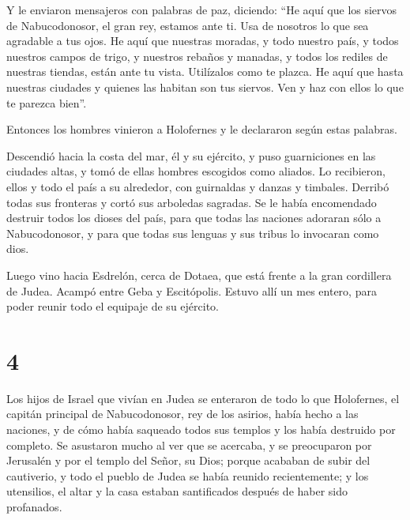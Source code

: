  Y le enviaron mensajeros con palabras de paz, diciendo:
 ``He aquí que los siervos de Nabucodonosor, el gran rey,
estamos ante ti. Usa de nosotros lo que sea agradable a tus ojos.
 He aquí que nuestras moradas, y todo nuestro país, y
todos nuestros campos de trigo, y nuestros rebaños y manadas, y todos
los rediles de nuestras tiendas, están ante tu vista. Utilízalos como te
plazca.  He aquí que hasta nuestras ciudades y quienes las
habitan son tus siervos. Ven y haz con ellos lo que te parezca bien''.

 Entonces los hombres vinieron a Holofernes y le
declararon según estas palabras.

 Descendió hacia la costa del mar, él y su ejército, y
puso guarniciones en las ciudades altas, y tomó de ellas hombres
escogidos como aliados.  Lo recibieron, ellos y todo el
país a su alrededor, con guirnaldas y danzas y timbales. 
Derribó todas sus fronteras y cortó sus arboledas sagradas. Se le había
encomendado destruir todos los dioses del país, para que todas las
naciones adoraran sólo a Nabucodonosor, y para que todas sus lenguas y
sus tribus lo invocaran como dios.

 Luego vino hacia Esdrelón, cerca de Dotaea, que está
frente a la gran cordillera de Judea.  Acampó entre Geba
y Escitópolis. Estuvo allí un mes entero, para poder reunir todo el
equipaje de su ejército.

\hypertarget{section-3}{%
\section{4}\label{section-3}}

 Los hijos de Israel que vivían en Judea se enteraron de
todo lo que Holofernes, el capitán principal de Nabucodonosor, rey de
los asirios, había hecho a las naciones, y de cómo había saqueado todos
sus templos y los había destruido por completo.  Se
asustaron mucho al ver que se acercaba, y se preocuparon por Jerusalén y
por el templo del Señor, su Dios;  porque acababan de
subir del cautiverio, y todo el pueblo de Judea se había reunido
recientemente; y los utensilios, el altar y la casa estaban santificados
después de haber sido profanados.

